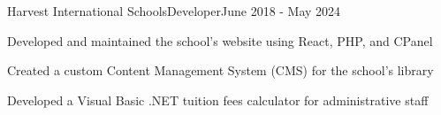 \begin{resume_employer}{Harvest International Schools}{Developer}{}{June 2018 - May 2024}
    \item Developed and maintained the school's website using React, PHP, and CPanel
    \item Created a custom Content Management System (CMS) for the school's library
    \item Developed a Visual Basic .NET tuition fees calculator for administrative staff
\end{resume_employer}

